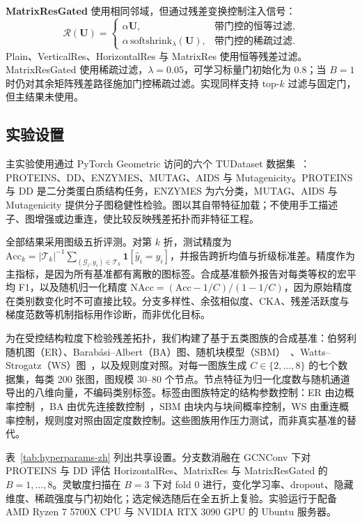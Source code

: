 \documentclass[9pt,twocolumn]{extarticle}
\begin{document}
\textbf{MatrixResGated} 使用相同邻域，但通过残差变换控制注入信号：
\begin{equation}
\mathcal{R}(\mathbf{U}) =
\begin{cases}
\alpha \mathbf{U}, & \text{带门控的恒等过滤},\\[2pt]
\alpha\,\mathrm{softshrink}_{\lambda}(\mathbf{U}), & \text{带门控的稀疏过滤}.
\end{cases}
\label{eq:gate-zh}
\end{equation}
Plain、VerticalRes、HorizontalRes 与 MatrixRes 使用恒等残差过滤。MatrixResGated 使用稀疏过滤，\(\lambda=0.05\)，可学习标量门初始化为 0.8；当 \(B=1\) 时仍对其余矩阵残差路径施加门控稀疏过滤。实现同样支持 top-\(k\) 过滤与固定门，但主结果未使用。

\subsection{实验设置}
\label{sec:setup-zh}

主实验使用通过 PyTorch Geometric 访问的六个 TUDataset 数据集~\cite{morris2020tudataset,fey2019fast}：PROTEINS、DD、ENZYMES、MUTAG、AIDS 与 Mutagenicity。PROTEINS 与 DD 是二分类蛋白质结构任务，ENZYMES 为六分类，MUTAG、AIDS 与 Mutagenicity 提供分子图稳健性检验。图以其自带特征加载；不使用手工描述子、图增强或边重连，使比较反映残差拓扑而非特征工程。

全部结果采用图级五折评测。对第 \(k\) 折，测试精度为 \(\mathrm{Acc}_{k}=|\mathcal{T}_{k}|^{-1}\sum_{(\mathcal{G}_{i},y_{i})\in\mathcal{T}_{k}}\mathbf{1}[\hat{y}_{i}=y_{i}]\)，并报告跨折均值与折级标准差。精度作为主指标，是因为所有基准都有离散的图标签。合成基准额外报告对每类等权的宏平均 F1，以及随机归一化精度 \(\mathrm{NAcc}=(\mathrm{Acc}-1/C)/(1-1/C)\)，因为原始精度在类别数变化时不可直接比较。分支多样性、余弦相似度、CKA、残差活跃度与梯度范数等机制指标用作诊断，而非优化目标。

为在受控结构粒度下检验残差拓扑，我们构建了基于五类图族的合成基准：伯努利随机图（ER）、Barab\'asi--Albert（BA）图、随机块模型（SBM）~\cite{holland1983stochastic}、Watts--Strogatz（WS）图~\cite{watts1998collective}，以及规则度对照。对每一图族生成 \(C\in\{2,\ldots,8\}\) 的七个数据集，每类 200 张图，图规模 30--80 个节点。节点特征为归一化度数与随机通道导出的八维向量，不编码类别标签。标签由图族特定的结构参数控制：ER 由边概率控制~\cite{gilbert1959random}，BA 由优先连接数控制~\cite{barabasi1999emergence}，SBM 由块内与块间概率控制，WS 由重连概率控制，规则度对照由固定度数控制。这些图族用作压力测试，而非真实基准的替代。

表~\ref{tab:hyperparams-zh} 列出共享设置。分支数消融在 GCNConv 下对 PROTEINS 与 DD 评估 HorizontalRes、MatrixRes 与 MatrixResGated 的 \(B=1,\ldots,8\)。灵敏度扫描在 \(B=3\) 下对 fold 0 进行，变化学习率、dropout、隐藏维度、稀疏强度与门初始化；选定候选随后在全五折上复验。实验运行于配备 AMD Ryzen 7 5700X CPU 与 NVIDIA RTX 3090 GPU 的 Ubuntu 服务器。
\end{document}
